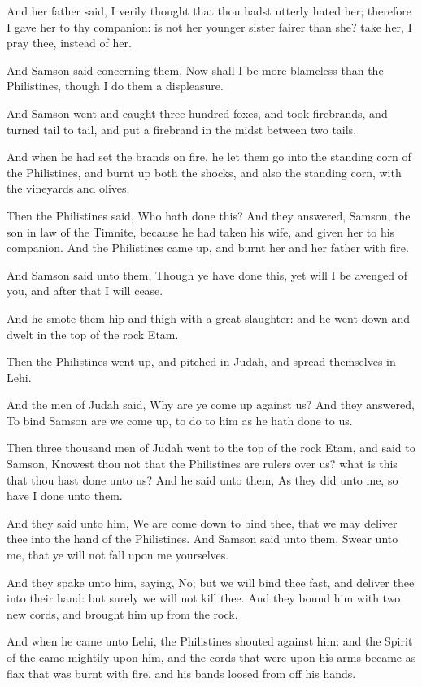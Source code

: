 \verse And her father said, I verily thought that thou hadst utterly hated her; therefore I gave her to thy companion: is not her younger sister fairer than she? take her, I pray thee, instead of her.

\verse And Samson said concerning them, Now shall I be more blameless than the Philistines, though I do them a displeasure.

\verse And Samson went and caught three hundred foxes, and took firebrands, and turned tail to tail, and put a firebrand in the midst between two tails.

\verse And when he had set the brands on fire, he let them go into the standing corn of the Philistines, and burnt up both the shocks, and also the standing corn, with the vineyards and olives.

\verse Then the Philistines said, Who hath done this? And they answered, Samson, the son in law of the Timnite, because he had taken his wife, and given her to his companion. And the Philistines came up, and burnt her and her father with fire.

\verse And Samson said unto them, Though ye have done this, yet will I be avenged of you, and after that I will cease.

\verse And he smote them hip and thigh with a great slaughter: and he went down and dwelt in the top of the rock Etam.

\verse Then the Philistines went up, and pitched in Judah, and spread themselves in Lehi.

\verse And the men of Judah said, Why are ye come up against us? And they answered, To bind Samson are we come up, to do to him as he hath done to us.

\verse Then three thousand men of Judah went to the top of the rock Etam, and said to Samson, Knowest thou not that the Philistines are rulers over us? what is this that thou hast done unto us? And he said unto them, As they did unto me, so have I done unto them.

\verse And they said unto him, We are come down to bind thee, that we may deliver thee into the hand of the Philistines. And Samson said unto them, Swear unto me, that ye will not fall upon me yourselves.

\verse And they spake unto him, saying, No; but we will bind thee fast, and deliver thee into their hand: but surely we will not kill thee.  And they bound him with two new cords, and brought him up from the rock.

\verse And when he came unto Lehi, the Philistines shouted against him: and the Spirit of the \LORD came mightily upon him, and the cords that were upon his arms became as flax that was burnt with fire, and his bands loosed from off his hands.

